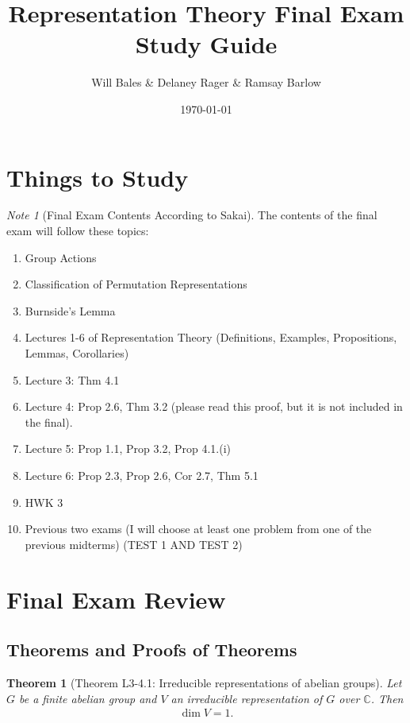 \documentclass[titlepage]{article}
\title{Representation Theory Final Exam Study Guide}
\author{Will Bales \& Delaney Rager \& Ramsay Barlow}
\date{\today}
\theoremstyle{plain}
\newtheorem{theorem}{Theorem}[section]
\theoremstyle{definition}
\theoremstyle{remark}
\newtheorem{note}{Note}
\theoremstyle{exercise-style}
\numberwithin{equation}{section}
\numberwithin{theorem}{section}
\numberwithin{remark}{section}
\begin{document}
\maketitle

\tableofcontents
\section{Things to Study}

\begin{myboxr}
    \begin{note}[Final Exam Contents According to Sakai]
        The contents of the final exam will follow these topics:
        \begin{enumerate}
            \item Group Actions
            \item Classification of Permutation Representations
            \item Burnside's Lemma
            \item Lectures 1-6 of Representation Theory (Definitions, Examples, Propositions, Lemmas, Corollaries) 
            \item Lecture 3: Thm 4.1
            \item Lecture 4: Prop 2.6, Thm 3.2 (please read this proof, but it is not included in the final).
            \item Lecture 5: Prop 1.1, Prop 3.2, Prop 4.1.(i)
            \item Lecture 6: Prop 2.3, Prop 2.6, Cor 2.7, Thm 5.1
            \item HWK 3
            \item Previous two exams (I will choose at least one problem from one of the previous midterms) (TEST 1 AND TEST 2)
        \end{enumerate}
    \end{note}
\end{myboxr}

\section{Final Exam Review}

\subsection{Theorems and Proofs of Theorems}

\begin{myboxg}
    \begin{theorem}[Theorem L3-4.1: Irreducible representations of abelian groups]
        Let $G$ be a finite abelian group and $V$ an irreducible representation of $G$ over $\mathbb{C}$. Then
        \begin{align}
        \dim V = 1.
        \end{align}
    \end{theorem}
\end{myboxg}
\end{document}
